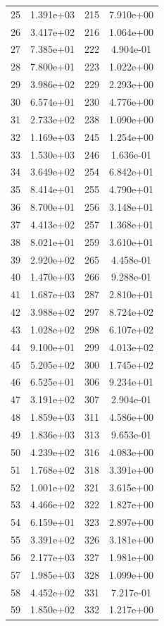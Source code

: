 \documentclass[12pt]{article}
\begin{document}
\begin{longtable}{@{}cccc@{}}
25 & 1.391e+03 & 215 & 7.910e+00 \\
26 & 3.417e+02 & 216 & 1.064e+00 \\
27 & 7.385e+01 & 222 & 4.904e-01 \\
28 & 7.800e+01 & 223 & 1.022e+00 \\
29 & 3.986e+02 & 229 & 2.293e+00 \\
30 & 6.574e+01 & 230 & 4.776e+00 \\
31 & 2.733e+02 & 238 & 1.090e+00 \\
32 & 1.169e+03 & 245 & 1.254e+00 \\
33 & 1.530e+03 & 246 & 1.636e-01 \\
34 & 3.649e+02 & 254 & 6.842e+01 \\
35 & 8.414e+01 & 255 & 4.790e+01 \\
36 & 8.700e+01 & 256 & 3.148e+01 \\
37 & 4.413e+02 & 257 & 1.368e+01 \\
38 & 8.021e+01 & 259 & 3.610e+01 \\
39 & 2.920e+02 & 265 & 4.458e-01 \\
40 & 1.470e+03 & 266 & 9.288e-01 \\
41 & 1.687e+03 & 287 & 2.810e+01 \\
42 & 3.988e+02 & 297 & 8.724e+02 \\
43 & 1.028e+02 & 298 & 6.107e+02 \\
44 & 9.100e+01 & 299 & 4.013e+02 \\
45 & 5.205e+02 & 300 & 1.745e+02 \\
46 & 6.525e+01 & 306 & 9.234e+01 \\
47 & 3.191e+02 & 307 & 2.904e-01 \\
48 & 1.859e+03 & 311 & 4.586e+00 \\
49 & 1.836e+03 & 313 & 9.653e-01 \\
50 & 4.239e+02 & 316 & 4.083e+00 \\
51 & 1.768e+02 & 318 & 3.391e+00 \\
52 & 1.001e+02 & 321 & 3.615e+00 \\
53 & 4.466e+02 & 322 & 1.827e+00 \\
54 & 6.159e+01 & 323 & 2.897e+00 \\
55 & 3.391e+02 & 326 & 3.181e+00 \\
56 & 2.177e+03 & 327 & 1.981e+00 \\
57 & 1.985e+03 & 328 & 1.099e+00 \\
58 & 4.452e+02 & 331 & 7.217e-01 \\
59 & 1.850e+02 & 332 & 1.217e+00 \\

\end{longtable}
\end{document}
